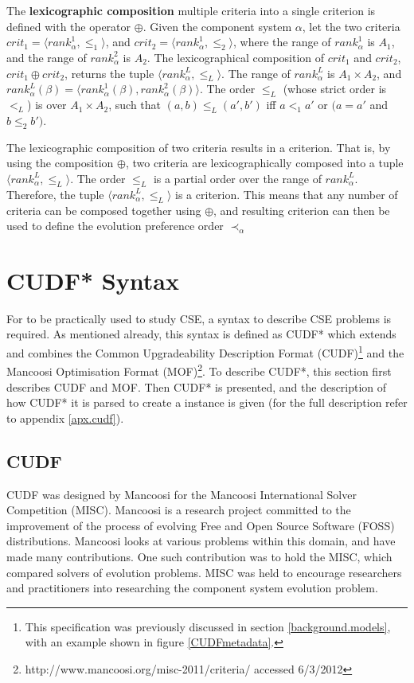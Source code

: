 \begin{defs}
\label{formal.defcritlex}
The \textbf{lexicographic composition} multiple criteria into a single criterion is defined with the operator $\oplus$.
Given the component system $\alpha$, let the two criteria $crit_1 = \langle rank^1_{\alpha}, \leq_{1} \rangle$, and $crit_2 = \langle rank^1_{\alpha}, \leq_{2} \rangle$,
where the range of $rank^1_{\alpha}$ is $A_1$, and the range of $rank^2_{\alpha}$ is $A_2$.
The lexicographical composition of $crit_1$ and $crit_2$, $crit_1 \oplus crit_2$, returns the tuple $\langle rank^L_{\alpha},\leq_L \rangle$.
The range of $rank^L_{\alpha}$ is $A_1 \times A_2$, and $rank^L_{\alpha}(\beta) = \langle rank^1_{\alpha}(\beta),rank^2_{\alpha}(\beta) \rangle$.
The order $\leq_L$ (whose strict order is $<_L$) is over $A_1 \times A_2$, such that $(a,b) \leq_L (a',b')$ iff $a <_1 a'$ or $(a = a'$ and $b \leq_2 b')$.
\end{defs}

The lexicographic composition of two criteria results in a criterion.
That is, by using the composition $\oplus$, two criteria are lexicographically composed into a tuple $\langle rank^L_{\alpha},\leq_L \rangle$.
The order $\leq_L$ is a partial order over the range of $rank^L_{\alpha}$.
Therefore, the tuple  $\langle rank^L_{\alpha},\leq_L \rangle$ is a criterion.
This means that any number of criteria can be composed together using $\oplus$,
and resulting criterion can then be used to define the evolution preference order $\prec_{\alpha}$


\section{CUDF* Syntax}
\label{formal.cudf}
For \modelname to be practically used to study CSE, a syntax to describe CSE problems is required.
As mentioned already, this syntax is defined as CUDF* which extends and combines the Common Upgradeability Description Format (CUDF)\footnote{This specification was previously discussed in section \ref{background.models}, with an example shown in figure \ref{CUDFmetadata}.
}
\citep{treinen2009common} and the Mancoosi Optimisation Format (MOF)\footnote{http://www.mancoosi.org/misc-2011/criteria/ accessed 6/3/2012}.
To describe CUDF*, this section first describes CUDF and MOF.
Then CUDF* is presented, and the description of how CUDF* it is parsed to create a \modelname instance is given (for the full description refer to appendix \ref{apx.cudf}).

\subsection{CUDF}
\label{formal.cudfDesign}
CUDF was designed by Mancoosi for the Mancoosi International Solver Competition (MISC).
Mancoosi is a research project committed to the improvement of the process of evolving Free and Open Source Software (FOSS) distributions.
Mancoosi looks at various problems within this domain, and have made many contributions.
One such contribution was to hold the MISC, which compared solvers of evolution problems.
MISC was held to encourage researchers and practitioners into researching the component system evolution problem.

